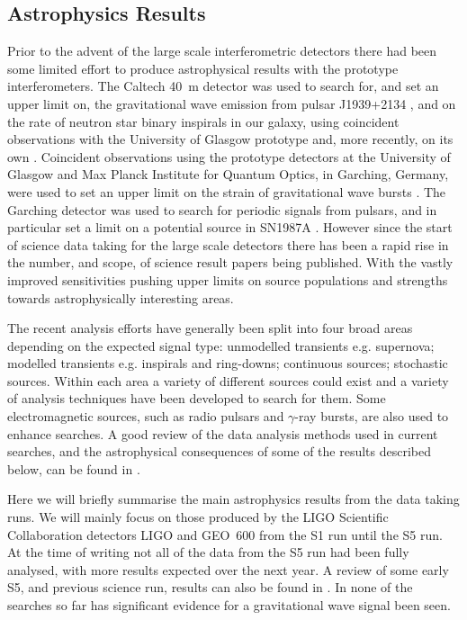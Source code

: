 \documentclass{article}
\begin{document}
\subsection{Astrophysics Results}\label{subsection:results}
Prior to the advent of the large scale interferometric detectors there had
been some limited effort to produce astrophysical results with the prototype
interferometers. The Caltech 40~m detector was used to search for, and set an
upper limit on, the gravitational wave emission from pulsar J1939+2134
\cite{Hereld:1984}, and on the rate of neutron star binary
inspirals in our galaxy, using coincident observations with the University of
Glasgow prototype \cite{Smith:1988} and, more recently, on its own
\cite{Allen:1999}. Coincident observations using the prototype detectors at the
University of Glasgow and Max Planck Institute for Quantum Optics, in Garching,
Germany, were used to set an upper limit on the strain of gravitational wave
bursts \cite{Nicholson:1996}. The Garching detector was used to search for
periodic signals from pulsars, and in particular set a limit on a potential
source in SN1987A \cite{Niebauer:1993}. However since the start of science data
taking for the large scale detectors there has been a rapid rise in the number,
and scope, of science result papers being published. With the vastly improved
sensitivities pushing upper limits on source populations and strengths towards
astrophysically interesting areas.

The recent analysis efforts have generally been split into four broad areas
depending on the expected signal type: unmodelled transients e.g. supernova;
modelled transients e.g. inspirals and ring-downs; continuous sources;
stochastic sources. Within each area a variety of different sources could
exist and a variety of analysis techniques have been developed to search for
them. Some electromagnetic sources, such as radio pulsars and $\gamma$-ray
bursts, are also used to enhance searches. A good review of the data analysis 
methods used in current searches, and the astrophysical consequences of some of 
the results described below, can be found in \cite{Sathyaprakash:2009}.

Here we will briefly summarise the main astrophysics results from the data
taking runs. We will mainly focus on those produced by the LIGO Scientific
Collaboration \cite{LSCweb} detectors LIGO and GEO~600 from the S1 run until the
S5 run. At the time of writing not all of the data from the S5 run had been
fully analysed, with more results expected over the next year. A
review of some early S5, and previous science run, results can also be found in
\cite{Papa:2008}. In none of the searches so far has significant evidence for a
gravitational wave signal been seen.
\end{document}
